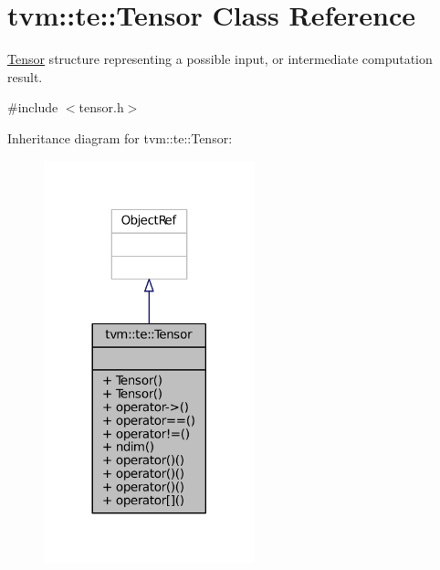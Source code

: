 \hypertarget{classtvm_1_1te_1_1Tensor}{}\section{tvm\+:\+:te\+:\+:Tensor Class Reference}
\label{classtvm_1_1te_1_1Tensor}


\hyperlink{classtvm_1_1te_1_1Tensor}{Tensor} structure representing a possible input, or intermediate computation result.  




{\ttfamily \#include $<$tensor.\+h$>$}



Inheritance diagram for tvm\+:\+:te\+:\+:Tensor\+:
\nopagebreak
\begin{figure}[H]
\begin{center}
\leavevmode
\includegraphics[width=173pt]{classtvm_1_1te_1_1Tensor__inherit__graph}
\end{center}
\end{figure}


